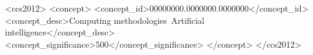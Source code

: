 \begin{CCSXML}
<ccs2012>
 <concept>
  <concept_id>00000000.0000000.0000000</concept_id>
  <concept_desc>Computing methodologies~Artificial intelligence</concept_desc>
  <concept_significance>500</concept_significance>
 </concept>
</ccs2012>
\end{CCSXML}

